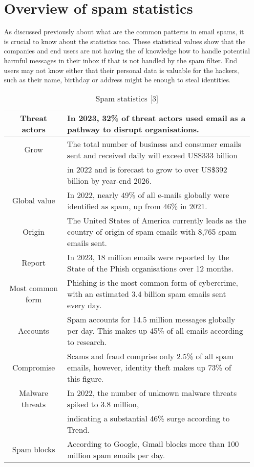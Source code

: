 ﻿\section{Overview of spam statistics}
As discussed previously about what are the common patterns in email spams, it is crucial to know about the statistics too.
These statistical values show that the companies and end users are not having the of knowledge how to handle potential harmful messages in their inbox if that is not handled by the spam filter.
End users may not know either that their personal data is valuable for the hackers, such as their name, birthday or address might be enough to steal identities.

\begin{table*}
    \label{spam_stats}
    \caption{Spam statistics [3]}
    \centering
    \begin{tabularx}{\textwidth}{| c | X |}
        \hline
        Threat actors & In 2023, 32\% of threat actors used email as a pathway to disrupt organisations. \\ 
        \hline
        Grow & The total number of business and consumer emails sent and received daily will exceed US\$333 billion \\
        & in 2022 and is forecast to grow to over US\$392 billion by year-end 2026.  \\ 
        \hline
        Global value       & In 2022, nearly 49\% of all e-mails globally were identified as spam, up from 46\% in 2021.  \\ 
        \hline
        Origin        & The United States of America currently leads as the country of origin of spam emails with 8,765 spam emails sent.  \\ 
        \hline
        Report       & In 2023, 18 million emails were reported by the State of the Phish organisations over 12 months.  \\ 
        \hline
        Most common form        & Phishing is the most common form of cybercrime, with an estimated 3.4 billion spam emails sent every day.  \\ 
        \hline
        Accounts       & Spam accounts for 14.5 million messages globally per day. This makes up 45\% of all emails according to research.  \\ 
        \hline
        Compromise      & Scams and fraud comprise only 2.5\% of all spam emails, however, identity theft makes up 73\% of this figure.  \\ 
        \hline
        Malware threats       & In 2022, the number of unknown malware threats spiked to 3.8 million, \\
        & indicating a substantial 46\% surge according to Trend. \\ 
        \hline
        Spam blocks      & According to Google, Gmail blocks more than 100 million spam emails per day.  \\ 
        \hline
    \end{tabularx}
\end{table*}